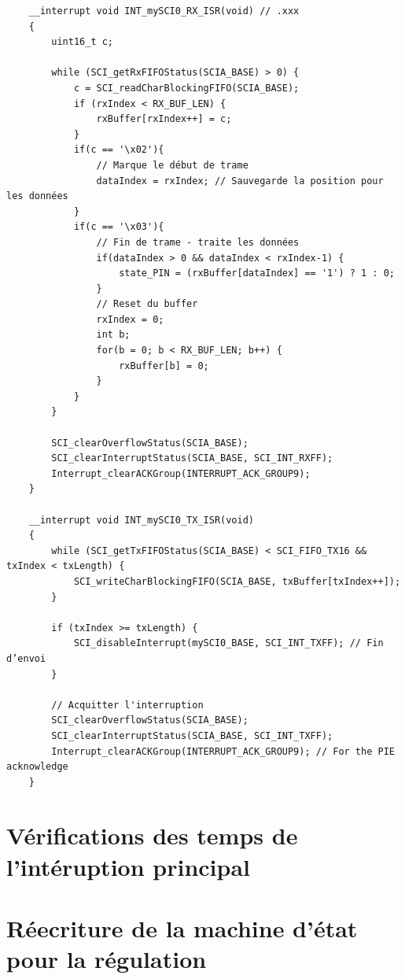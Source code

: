 \begin{verbatim}
    __interrupt void INT_mySCI0_RX_ISR(void) // .xxx
    {
        uint16_t c;

        while (SCI_getRxFIFOStatus(SCIA_BASE) > 0) {
            c = SCI_readCharBlockingFIFO(SCIA_BASE);
            if (rxIndex < RX_BUF_LEN) {
                rxBuffer[rxIndex++] = c;
            }
            if(c == '\x02'){
                // Marque le début de trame
                dataIndex = rxIndex; // Sauvegarde la position pour les données
            }
            if(c == '\x03'){
                // Fin de trame - traite les données
                if(dataIndex > 0 && dataIndex < rxIndex-1) {
                    state_PIN = (rxBuffer[dataIndex] == '1') ? 1 : 0;
                }
                // Reset du buffer
                rxIndex = 0;
                int b;
                for(b = 0; b < RX_BUF_LEN; b++) {
                    rxBuffer[b] = 0;
                }
            }
        }

        SCI_clearOverflowStatus(SCIA_BASE);
        SCI_clearInterruptStatus(SCIA_BASE, SCI_INT_RXFF);
        Interrupt_clearACKGroup(INTERRUPT_ACK_GROUP9);
    }

    __interrupt void INT_mySCI0_TX_ISR(void)
    {
        while (SCI_getTxFIFOStatus(SCIA_BASE) < SCI_FIFO_TX16 && txIndex < txLength) {
            SCI_writeCharBlockingFIFO(SCIA_BASE, txBuffer[txIndex++]);
        }

        if (txIndex >= txLength) {
            SCI_disableInterrupt(mySCI0_BASE, SCI_INT_TXFF); // Fin d’envoi
        }

        // Acquitter l'interruption
        SCI_clearOverflowStatus(SCIA_BASE);
        SCI_clearInterruptStatus(SCIA_BASE, SCI_INT_TXFF);
        Interrupt_clearACKGroup(INTERRUPT_ACK_GROUP9); // For the PIE acknowledge
    }
\end{verbatim}

\section{Vérifications des temps de l'intéruption principal}

\section{Réecriture de la machine d'état pour la régulation}